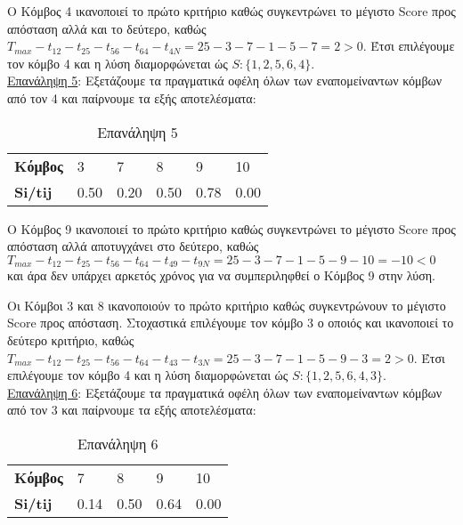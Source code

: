 \documentclass[12pt, a4paper]{article}
\begin{document}
Ο Κόμβος 4 ικανοποιεί το πρώτο κριτήριο καθώς συγκεντρώνει το μέγιστο Score προς απόσταση αλλά και το δεύτερο, καθώς  \( T_{max} - t_{12} - t_{25} - t_{56} - t_{64} - t_{4N} = 25 - 3 - 7 - 1 - 5 - 7 = 2 > 0\). Έτσι επιλέγουμε τον κόμβο 4 και η λύση διαμορφώνεται ώς \( S: \{1,2,5,6,4\}\). \\

\underline{Επανάληψη 5}:  Εξετάζουμε τα πραγματικά οφέλη όλων των εναπομείναντων κόμβων από τον 4  και παίρνουμε τα εξής αποτελέσματα:

\begin{table}[h]
\centering
\begin{tabular}{l|l|l|l|l|l|}
\cline{2-6}
\textbf{Κόμβος} & 3 & 7 & 8 & 9 & 10 \\ \cline{2-6} 
\textbf{Si/tij} & 0.50 & 0.20 & 0.50 & 0.78 & 0.00 \\ \cline{2-6} 
\end{tabular}
\caption{Επανάληψη 5}
\label{my-label}
\end{table}

Ο Κόμβος 9 ικανοποιεί το πρώτο κριτήριο καθώς συγκεντρώνει το μέγιστο Score προς απόσταση αλλά αποτυγχάνει στο δεύτερο, καθώς  \( T_{max} -t_{12} - t_{25} - t_{56}  - t_{64} - t_{49} - t_{9N} = 25 - 3 - 7 - 1 - 5 - 9 - 10 = -10 < 0\) και άρα δεν υπάρχει αρκετός χρόνος για να συμπεριληφθεί ο Κόμβος 9 στην λύση. 

Οι Κόμβοι 3 και 8 ικανοποιούν το πρώτο κριτήριο καθώς συγκεντρώνουν το μέγιστο Score προς απόσταση. Στοχαστικά επιλέγουμε τον κόμβο 3 ο οποιός και ικανοποιεί το δεύτερο κριτήριο, καθώς  \( T_{max} - t_{12} - t_{25} - t_{56} - t_{64} - t_{43} - t_{3N} = 25 - 3 - 7 - 1 - 5 - 9 - 3 = 2 > 0\). Έτσι επιλέγουμε τον κόμβο 4 και η λύση διαμορφώνεται ώς \( S: \{1,2,5,6,4,3\}\). \\

\underline{Επανάληψη 6}:  Εξετάζουμε τα πραγματικά οφέλη όλων των εναπομείναντων κόμβων από τον 3  και παίρνουμε τα εξής αποτελέσματα:

\begin{table}[h]
\centering
\begin{tabular}{l|l|l|l|l|}
\cline{2-5}
\textbf{Κόμβος} & 7 & 8 & 9 & 10 \\ \cline{2-5} 
\textbf{Si/tij} & 0.14 & 0.50 & 0.64 & 0.00 \\ \cline{2-5} 
\end{tabular}
\caption{Επανάληψη 6}
\label{my-label}
\end{table}
\end{document}
